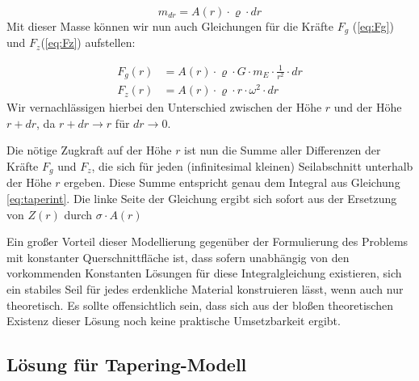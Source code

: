 \documentclass[a4paper, 10pt]{report}
\begin{document}
\begin{equation}
m_{dr} = A(r) \cdot \varrho \cdot dr
\label{eq:samass}
\end{equation}
Mit dieser Masse können wir nun auch Gleichungen für die Kräfte $F_g$ (\ref{eq:Fg}) und $F_z$(\ref{eq:Fz}) aufstellen:

\begin{align}
F_g(r) &= A(r) \cdot \varrho \cdot G \cdot m_E \cdot \frac{1}{r^2} \cdot dr\label{eq:Fg}\\
F_z(r) &= A(r) \cdot \varrho \cdot r \cdot \omega^2 \cdot dr\label{eq:Fz}
\end{align}
Wir vernachlässigen hierbei den Unterschied zwischen der Höhe $r$ und der Höhe $r+dr$, da $r+dr\rightarrow r$ für $dr \rightarrow 0$.

Die nötige Zugkraft auf der Höhe $r$ ist nun die Summe aller Differenzen der Kräfte $F_g$ und $F_z$, die sich für jeden (infinitesimal kleinen) Seilabschnitt unterhalb der Höhe $r$ ergeben. Diese Summe entspricht genau dem Integral aus Gleichung \ref{eq:taperint}. Die linke Seite der Gleichung ergibt sich sofort aus der Ersetzung von $Z(r)$ durch $\sigma \cdot A(r)$

Ein großer Vorteil dieser Modellierung gegenüber der Formulierung des Problems mit konstanter Querschnittfläche ist, dass sofern unabhängig von den vorkommenden Konstanten Lösungen für diese Integralgleichung existieren, sich ein stabiles Seil für jedes erdenkliche Material konstruieren lässt, wenn auch nur theoretisch. Es sollte offensichtlich sein, dass sich aus der bloßen theoretischen Existenz dieser Lösung noch keine praktische Umsetzbarkeit ergibt.

\subsection{Lösung für Tapering-Modell}
\end{document}

